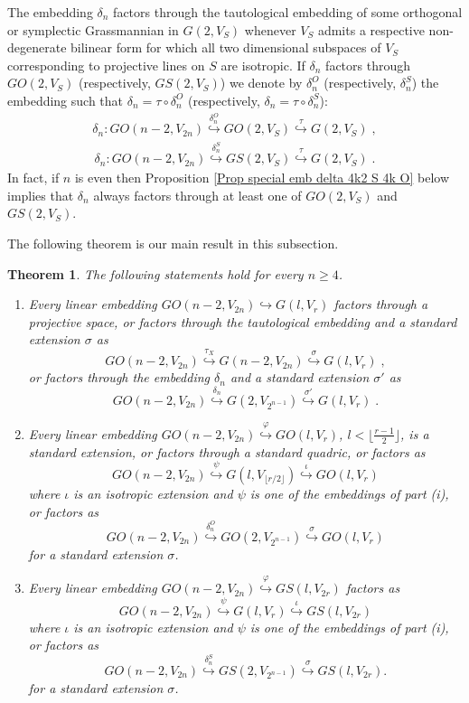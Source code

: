 \documentclass[12pt]{amsart}
\def\hw  {\hookrightarrow}
\newtheorem{theorem}{Theorem}[section]
\begin{document}
The embedding $\delta_n$ factors through the tautological embedding of some orthogonal or symplectic Grassmannian in $G(2,V_S)$ whenever $V_S$ admits a respective non-degenerate bilinear form for which all two dimensional subspaces of $V_S$ corresponding to projective lines on $S$ are isotropic. If $\delta_n$ factors through $GO(2,V_S)$ (respectively, $GS(2,V_S)$) we denote by $\delta_n^O$ (respectively, $\delta_n^S$) the embedding such that $\delta_n=\tau\circ\delta_n^O$ (respectively, $\delta_n=\tau\circ\delta_n^S$):
\begin{gather}\label{For delta O}
\delta_n : GO(n-2,V_{2n}) \stackrel{\delta_n^O}{\hw} GO(2,V_S) \stackrel{\tau}{\hw} G(2,V_S) \;,
\end{gather}
\begin{gather}\label{For delta S}
\delta_n : GO(n-2,V_{2n}) \stackrel{\delta_n^S}{\hw} GS(2,V_S) \stackrel{\tau}{\hw} G(2,V_S) \;.
\end{gather}
In fact, if $n$ is even then Proposition \ref{Prop special emb delta 4k2 S 4k O} below implies that $\delta_n$ always factors through at least one of $GO(2,V_S)$ and $GS(2,V_S)$. 

The following theorem is our main result in this subsection.

\begin{theorem}\label{Theo Embed GOcodim2}
The following statements hold for every $n\geq 4$.
\begin{enumerate}
\item[{\rm (i)}] Every linear embedding $GO(n-2,V_{2n})\hookrightarrow G(l,V_r)$ factors through a projective space, or factors through the tautological embedding and a standard extension $\sigma$ as
$$
GO(n-2,V_{2n}) \stackrel{\tau_X}{\hookrightarrow} G(n-2,V_{2n}) \stackrel{\sigma}{\hookrightarrow} G(l,V_r) \;,
$$
or factors through the embedding $\delta_n$ and a standard extension $\sigma'$ as
$$
GO(n-2,V_{2n}) \stackrel{\delta_n}{\hookrightarrow} G(2,V_{2^{n-1}}) \stackrel{\sigma'}{\hookrightarrow} G(l,V_r) \;.
$$
\item[{\rm (ii)}] Every linear embedding $GO(n-2,V_{2n})\stackrel{\varphi}{\hookrightarrow} GO(l,V_r)$, $l<\lfloor\frac{r-1}{2}\rfloor$, is a standard extension, or factors through a standard quadric, or factors as
$$
GO(n-2,V_{2n}) \stackrel{\psi}{\hookrightarrow} G(l,V_{\lfloor r/2\rfloor}) \stackrel{\iota}{\hookrightarrow} GO(l,V_r)
$$
where $\iota$ is an isotropic extension and $\psi$ is one of the embeddings of part (i), or factors as
$$
GO(n-2,V_{2n}) \stackrel{\delta_{n}^O}{\hookrightarrow} GO(2,V_{2^{n-1}}) \stackrel{\sigma}{\hookrightarrow} GO(l,V_r)
$$
for a standard extension $\sigma$.
\item[{\rm (iii)}] Every linear embedding $GO(n-2,V_{2n})\stackrel{\varphi}{\hookrightarrow} GS(l,V_{2r})$ factors as
$$
GO(n-2,V_{2n}) \stackrel{\psi}{\hookrightarrow} G(l,V_{r}) \stackrel{\iota}{\hookrightarrow} GS(l,V_{2r})
$$
where $\iota$ is an isotropic extension and $\psi$ is one of the embeddings of part (i), or factors as
$$
GO(n-2,V_{2n}) \stackrel{\delta_{n}^S}{\hookrightarrow} GS(2,V_{2^{n-1}}) \stackrel{\sigma}{\hookrightarrow} GS(l,V_{2r}).
$$
for a standard extension $\sigma$.
\end{enumerate}
\end{theorem}
\end{document}
